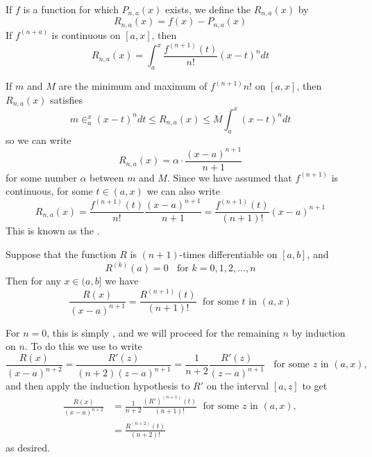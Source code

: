 \documentclass[12pt]{report}
\begin{document}
\begin{defn}{}{}
    If $f$ is a function for which $P_{n,a}(x)$ exists, we define the  $R_{n,a}(x)$ by \begin{equation*}
        R_{n,a}(x) = f(x) - P_{n,a}(x)
    \end{equation*}
    If $f^{(n+a)}$ is continuous on $[a,x]$, then \begin{equation*}
        R_{n,a}(x) = \int_a^x\frac{f^{(n+1)}(t)}{n!}(x-t)^ndt
    \end{equation*}
\end{defn}

\begin{rmk}{}{}
    If $m$ and $M$ are the minimum and maximum of $f^{(n+1)}{n!}$ on $[a,x]$, then $R_{n,a}(x)$ satisfies \begin{equation*}
        m\in_a^x(x-t)^ndt\leq R_{n,a}(x)\leq M\int_a^x(x-t)^ndt
    \end{equation*}
    so we can write \begin{equation*}
        R_{n,a}(x) = \alpha\cdot \frac{(x-a)^{n+1}}{n+1}
    \end{equation*}
    for some number $\alpha$ between $m$ and $M$. Since we have assumed that $f^{(n+1)}$ is continuous, for some $t \in (a,x)$ we can also write \begin{equation*}
        R_{n,a}(x) = \frac{f^{(n+1)}(t)}{n!}\frac{(x-a)^{n+1}}{n+1} = \frac{f^{(n+1)}(t)}{(n+1)!}(x-a)^{n+1}
    \end{equation*}
    This is known as the .
\end{rmk}


\begin{lem}{}{}
    Suppose that the function $R$ is $(n+1)$-times differentiable on $[a,b]$, and \begin{equation*}
        R^{(k)}(a) = 0\;\;\text{ for } k =0,1,2,...,n
    \end{equation*}
    Then for any $x \in (a,b]$ we have \begin{equation*}
        \frac{R(x)}{(x-a)^{n+1}} = \frac{R^{(n+1)}(t)}{(n+1)!}\;\text{ for some $t$ in } (a,x)
    \end{equation*}
\end{lem}
\begin{proof*}{}{}
    For $n = 0$, this is simply , and we will proceed for the remaining $n$ by induction on $n$. To do this we use  to write \begin{equation*}
        \frac{R(x)}{(x-a)^{n+2}} = \frac{R'(z)}{(n+2)(z-a)^{n+1}} = \frac{1}{n+2}\frac{R'(z)}{(z-a)^{n+1}}\;\;\text{ for some $z$ in } (a,x),
    \end{equation*}
    and then apply the induction hypothesis to $R'$ on the interval $[a,z]$ to get \begin{align*}
        \frac{R(x)}{(x-a)^{n+2}} &= \frac{1}{n+2}\frac{(R')^{(n+1)}(t)}{(n+1)!}\;\text{ for some $z$ in } (a,x), \\
        &= \frac{R^{(n+2)}(t)}{(n+2)!}
    \end{align*}
    as desired.
\end{proof*}
\end{document}
